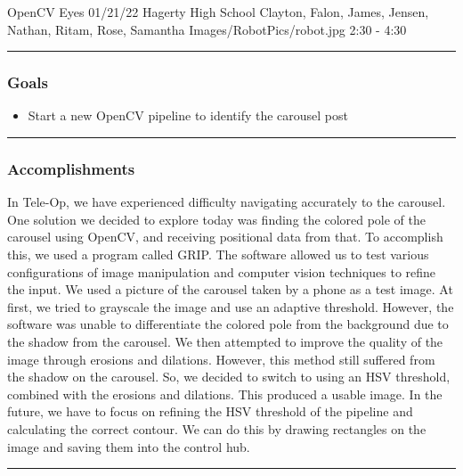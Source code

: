 \insertmeeting 
	{OpenCV Eyes} 
	{01/21/22} 
	{Hagerty High School}
	{Clayton, Falon, James, Jensen, Nathan, Ritam, Rose, Samantha}
	{Images/RobotPics/robot.jpg}
	{2:30 - 4:30}
	
\noindent\hfil\rule{\textwidth}{.4pt}\hfil
\subsubsection*{Goals}
\begin{itemize}
    \item Start a new OpenCV pipeline to identify the carousel post 

\end{itemize} 

\noindent\hfil\rule{\textwidth}{.4pt}\hfil

\subsubsection*{Accomplishments}
In Tele-Op, we have experienced difficulty navigating accurately to the carousel. One solution we decided to explore today was finding the colored pole of the carousel using OpenCV, and receiving positional data from that. To accomplish this, we used a program called GRIP. The software allowed us to test various configurations of image manipulation and computer vision techniques to refine the input. We used a picture of the carousel taken by a phone as a test image. At first, we tried to grayscale the image and use an adaptive threshold. However, the software was unable to differentiate the colored pole from the background due to the shadow from the carousel. We then attempted to improve the quality of the image through erosions and dilations. However, this method still suffered from the shadow on the carousel. So, we decided to switch to using an HSV threshold, combined with the erosions and dilations. This produced a usable image. In the future, we have to focus on refining the HSV threshold of the pipeline and calculating the correct contour. We can do this by drawing rectangles on the image and saving them into the control hub. 


\noindent\hfil\rule{\textwidth}{.4pt}\hfil
